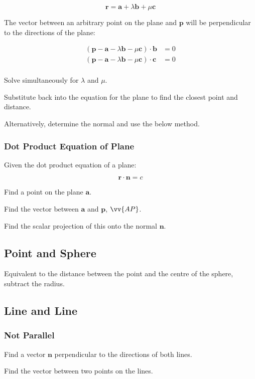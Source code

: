 \documentclass[a4paper,11pt]{article}
\newcommand{\bb}{\boldsymbol}
\begin{document}
$$
\bb{r} = \bb{a} + \lambda \bb{b} + \mu \bb{c}
$$

The vector between an arbitrary point on the plane and $\bb{p}$ will be
perpendicular to the directions of the plane:

$$
\begin{aligned}
(\bb{p} - \bb{a} - \lambda \bb{b} - \mu \bb{c}) \cdot \bb{b} & = 0 \\
(\bb{p} - \bb{a} - \lambda \bb{b} - \mu \bb{c}) \cdot \bb{c} & = 0 \\
\end{aligned}
$$

Solve simultaneously for $\lambda$ and $\mu$.

Substitute back into the equation for the plane to find the closest point and
distance.

Alternatively, determine the normal and use the below method.


\subsubsection{Dot Product Equation of Plane}

Given the dot product equation of a plane:

$$
\bb{r} \cdot \bb{n} = c
$$

Find a point on the plane $\bb{a}$.

Find the vector between $\bb{a}$ and $\bb{p}$, $\vv{AP}$.

Find the scalar projection of this onto the normal $\bb{n}$.


\subsection{Point and Sphere}

Equivalent to the distance between the point and the centre of the sphere,
subtract the radius.


\subsection{Line and Line}

\subsubsection{Not Parallel}

Find a vector $\bb{n}$ perpendicular to the directions of both lines.

Find the vector between two points on the lines.
\end{document}
